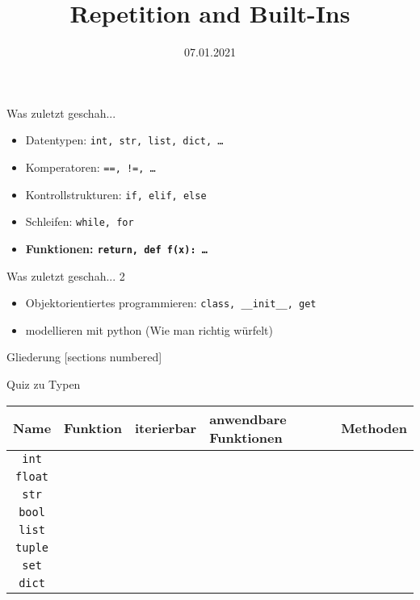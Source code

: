



\title{Repetition and Built-Ins}
\date{07.01.2021}


	
\maketitle

\begin{frame}{Was zuletzt geschah...}
	\begin{itemize}
		\item Datentypen: \texttt{int, str, list, dict, \ldots}
		\item Komperatoren: \texttt{==, !=, \ldots}
		\item Kontrollstrukturen: \texttt{if, elif, else}
		\item Schleifen: \texttt{while, for}
		\item \textbf{\alert{Funktionen: \texttt{return, def f(x): \ldots}}}
	\end{itemize}
\end{frame}

\begin{frame}{Was zuletzt geschah... 2}
	\begin{itemize}
		\item Objektorientiertes programmieren: \texttt{class, \_\_init\_\_, get}
		\item modellieren mit python (Wie man richtig würfelt)
	\end{itemize}
\end{frame}

\begin{frame}{Gliederung}
	[sections numbered]
	\tableofcontents
\end{frame}

\begin{frame}{Quiz zu Typen}
	\footnotesize
	\begin{tabular}{c|l|l|l|l}
		Name & Funktion &iterierbar &anwendbare Funktionen &  Methoden\\ 
		\hline
		\texttt{int} & &&& \\
		\texttt{float} &  &&& \\
		\texttt{str} &  &&& \\
		\texttt{bool} &  &&&\\ \hline
		\texttt{list} &  &&& \\
		\texttt{tuple} & &&& \\
		\texttt{set} &  &&& \\
		\texttt{dict} &  &&& \\
	\end{tabular}
\end{frame}


